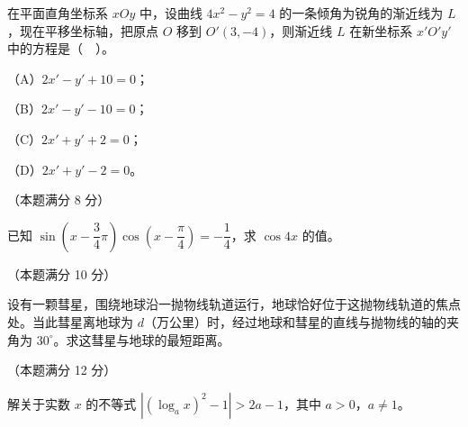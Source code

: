 \begin{question}
在平面直角坐标系 $xOy$ 中，设曲线 $4x^{2}-y^{2}=4$ 的一条倾角为锐角的渐近线为 $L$，现在平移坐标轴，把原点 $O$ 移到 $O'(3,-4)$，则渐近线 $L$ 在新坐标系 $x'O'y'$ 中的方程是（　）。

（A）$2x'-y'+10=0$；

（B）$2x'-y'-10=0$；

（C）$2x'+y'+2=0$；

（D）$2x'+y'-2=0$。

\end{question}

\begin{question}
（本题满分 8 分）

已知 $\sin\left(x-\dfrac{3}{4}\pi\right)\cos\left(x-\dfrac{\pi}{4}\right)=-\dfrac{1}{4}$，求 $\cos 4x$ 的值。

\end{question}
\begin{question}
（本题满分 10 分）

设有一颗彗星，围绕地球沿一抛物线轨道运行，地球恰好位于这抛物线轨道的焦点处。当此彗星离地球为 $d$（万公里）时，经过地球和彗星的直线与抛物线的轴的夹角为 $30^{\circ}$。求这彗星与地球的最短距离。

\end{question}
\begin{question}
（本题满分 12 分）

解关于实数 $x$ 的不等式 $\left|(\log_{a}x)^{2}-1\right|>2a-1$，其中 $a>0$，$a\ne 1$。

\end{question}

